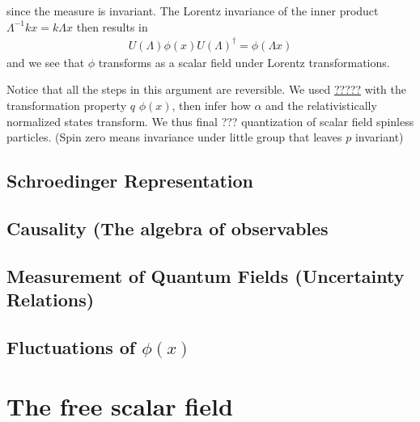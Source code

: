 \documentclass{article}
\begin{document}
since the measure is invariant. The Lorentz invariance of the inner product $\Lambda^{-1}k x=k\Lambda x$ then results in
\begin{align}
U(\Lambda)\phi(x)U(\Lambda)^\dagger=\phi(\Lambda x)
\end{align}
and we see that $\phi$ transforms as a scalar field under Lorentz transformations.

Notice that all the steps in this argument are reversible. We used \underline{?????} with the transformation property $q$ $\phi(x)$, then infer how $\alpha$ and the relativistically normalized states transform. We thus final ??? quantization of scalar field spinless particles. (Spin zero means invariance under little group that leaves $p$ invariant)



\subsection{Schroedinger Representation}
\subsection{Causality (The algebra of observables}

\subsection{Measurement of Quantum Fields (Uncertainty Relations)}

\subsection{Fluctuations of $\phi(x)$}

\section{The free scalar field}
\end{document}
